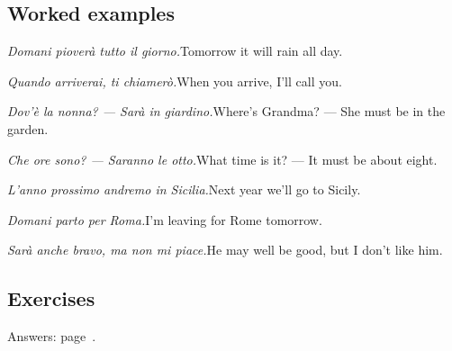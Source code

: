 \documentclass[11pt,a4paper,twoside,openright]{book}
\begin{document}
\subsection*{Worked examples}
\begin{examples}
\item\relax \textit{Domani pioverà tutto il giorno.}\newline Tomorrow it will rain all day.
\item\relax \textit{Quando arriverai, ti chiamerò.}\newline When you arrive, I'll call you.
\item\relax \textit{Dov'è la nonna? — Sarà in giardino.}\newline Where's Grandma? — She must be in the garden.
\item\relax \textit{Che ore sono? — Saranno le otto.}\newline What time is it? — It must be about eight.
\item\relax \textit{L'anno prossimo andremo in Sicilia.}\newline Next year we'll go to Sicily.
\item\relax \textit{Domani parto per Roma.}\newline I'm leaving for Rome tomorrow.
\item\relax \textit{Sarà anche bravo, ma non mi piace.}\newline He may well be good, but I don't like him.
\end{examples}

\subsection*{Exercises}\label{les:futuro-semplice:exercises}
{\color{muted}\small Answers: page~\pageref{ans:futuro-semplice}.}
\end{document}
